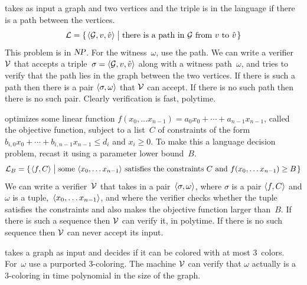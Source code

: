 \documentclass[9pt,t,serif,professionalfont,xcolor={table,dvipsnames},noamsthm]{beamer}
\begin{document}
\begin{frame}
\begin{example}
takes as input a graph and two vertices and the triple is in the language if
there is a path between the vertices.
\begin{equation*}
  \lang=\set{\sequence{\mathcal{G},v,\hat{v}}\suchthat
              \text{there is a path in $\mathcal{G}$ from $v$ to $\hat{v}$}}
\end{equation*}
This problem is in $\NP$.
For the witness~$\omega$, use the path.
We can write a verifier~$\TM[V]$ that accepts a 
triple~$\sigma=\sequence{\mathcal{G},v,\hat{v}}$ along with a 
witness path~$\omega$, 
and tries to verify that the path lies in the graph between
the two vertices.
If there is such a path then there is a pair $\sequence{\sigma,\omega}$ 
that $\TM[V]$ can accept.
If there is no such path then there is no such pair. 
Clearly verification is fast, polytime.
\end{example}

\pause
\begin{example}
\alert{} optimizes some linear function
$f(x_0,\ldots x_{n-1})=a_0x_0+\cdots+a_{n-1}x_{n-1}$, called the objective function, 
subject to a list~$C$ of constraints of the form
$b_{i,0}x_0+\cdots+b_{i,n-1}x_{n-1}\leq d_i$ and $x_i\geq 0$.
To make this a language decision problem, recast it using a parameter 
lower bound~$B$.
\begin{equation*}
  \lang_B=\set{\sequence{f,C}\suchthat
    \text{some $\sequence{x_0,\ldots x_{n-1}}$ satisfies the constraints~$C$ and~$f(x_0,\ldots x_{n-1})\geq B$}}
\end{equation*}
We can write a verifier~$\TM[V]$ that takes in a
pair~$\sequence{\sigma,\omega}$, where $\sigma$ is a pair $\sequence{f,C}$ and
$\omega$ is a tuple,~$\sequence{x_0,\ldots{}x_{n-1}}$,
and where the verifier checks whether the tuple satisfies the
constraints and also makes the objective function larger than~$B$.
If there is such a sequence then $\TM[V]$ can verify it, in polytime.
If there is no such sequence then $\TM[V]$ can never accept its input.  
\end{example}

\pause
\begin{example}
\alert{} takes a graph as input
and decides if it can be colored with at most $3$~colors.
For~$\omega$ use a purported $3$-coloring.
The machine $\TM[V]$ can verify that $\omega$ actually is a $3$-coloring  
in time polynomial in the size of the graph.
\end{example}
\end{frame}
\end{document}
